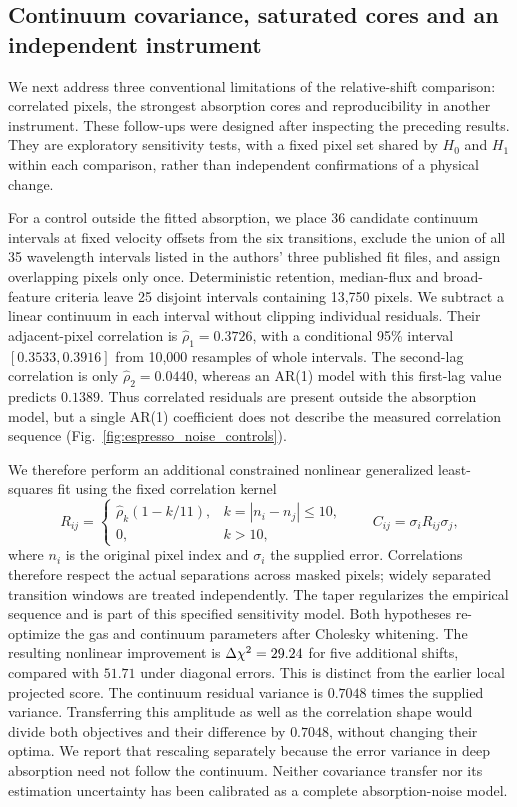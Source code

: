 \subsection{Continuum covariance, saturated cores and an independent instrument}
\label{sec:espresso_followup}

We next address three conventional limitations of the relative-shift comparison: correlated pixels, the strongest absorption cores and reproducibility in another instrument. These follow-ups were designed after inspecting the preceding results. They are exploratory sensitivity tests, with a fixed pixel set shared by $H_0$ and $H_1$ within each comparison, rather than independent confirmations of a physical change.

For a control outside the fitted absorption, we place 36 candidate continuum intervals at fixed velocity offsets from the six transitions, exclude the union of all 35 wavelength intervals listed in the authors' three published fit files, and assign overlapping pixels only once. Deterministic retention, median-flux and broad-feature criteria leave 25 disjoint intervals containing 13,750 pixels. We subtract a linear continuum in each interval without clipping individual residuals. Their adjacent-pixel correlation is $\widehat\rho_1=0.3726$, with a conditional 95\% interval $[0.3533,0.3916]$ from 10,000 resamples of whole intervals. The second-lag correlation is only $\widehat\rho_2=0.0440$, whereas an AR(1) model with this first-lag value predicts $0.1389$. Thus correlated residuals are present outside the absorption model, but a single AR(1) coefficient does not describe the measured correlation sequence (Fig.~\ref{fig:espresso_noise_controls}).

We therefore perform an additional constrained nonlinear generalized least-squares fit using the fixed correlation kernel
\begin{equation}
 R_{ij}=\begin{cases}
 \widehat\rho_k(1-k/11),&k=|n_i-n_j|\leq10,\\
 0,&k>10,
 \end{cases}
 \qquad C_{ij}=\sigma_i R_{ij}\sigma_j,
 \label{eq:espresso_control_covariance}
\end{equation}
where $n_i$ is the original pixel index and $\sigma_i$ the supplied error. Correlations therefore respect the actual separations across masked pixels; widely separated transition windows are treated independently. The taper regularizes the empirical sequence and is part of this specified sensitivity model. Both hypotheses re-optimize the gas and continuum parameters after Cholesky whitening. The resulting nonlinear improvement is $\Delta\chi^2=29.24$ for five additional shifts, compared with $51.71$ under diagonal errors. This is distinct from the earlier local projected score. The continuum residual variance is $0.7048$ times the supplied variance. Transferring this amplitude as well as the correlation shape would divide both objectives and their difference by $0.7048$, without changing their optima. We report that rescaling separately because the error variance in deep absorption need not follow the continuum. Neither covariance transfer nor its estimation uncertainty has been calibrated as a complete absorption-noise model.

